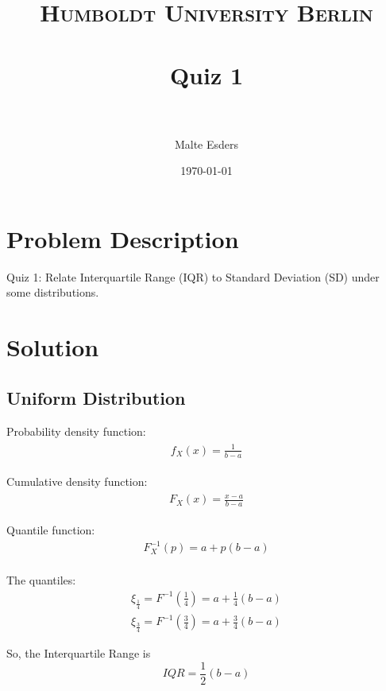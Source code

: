 \documentclass[paper=a4, fontsize=11pt]{scrartcl} %
\title{	
\normalfont \normalsize 
\textsc{Humboldt University Berlin} \\ [25pt] 
\horrule{0.5pt} \\[0.4cm] 
\huge Quiz 1 \\ 
\horrule{2pt} \\[0.5cm] 
}
\author{Malte Esders}
\date{\normalsize\today}
\numberwithin{equation}{section} %
\numberwithin{figure}{section} %
\numberwithin{table}{section} %
\begin{document}
\maketitle %

\section{Problem Description}
Quiz 1: Relate Interquartile Range (IQR) to Standard Deviation (SD) under some distributions.
\newpage

\section{Solution}

\subsection{Uniform Distribution}
Probability density function:
\begin{align} 
\begin{split}
	f_X(x) = \frac{1}{b-a}
\end{split}					
\end{align}

Cumulative density function:
\begin{align} 
\begin{split}
	F_X(x) = \frac{x-a}{b-a}
\end{split}					
\end{align}

Quantile function:
\begin{equation}
\begin{aligned} 
	F_X^{-1}(p) = a + p(b-a)  \\
\end{aligned}
\end{equation}

The quantiles:
\begin{equation}
\begin{aligned} 
	\xi_{\frac{1}{4}} = F^{-1}(\tfrac{1}{4}) = a + \frac{1}{4}(b-a) \\
	\xi_{\frac{3}{4}} = F^{-1}(\tfrac{3}{4}) = a + \frac{3}{4}(b-a)
\end{aligned}
\end{equation}

So, the Interquartile Range is
\begin{equation}
	IQR = \frac{1}{2}(b-a)
\end{equation}
\end{document}
